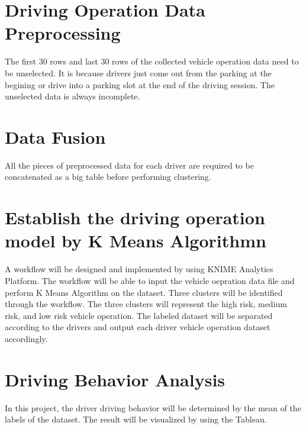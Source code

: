 \section{Driving Operation Data Preprocessing}
The first 30 rows and last 30 rows of the collected vehicle operation data need to be unselected. It is because drivers just come out from the parking at the begining or drive into a parking slot at the end of the driving session. The unselected data is always incomplete.

\section{Data Fusion}
All the pieces of preprocessed data for each driver are required to be concatenated as a big table before performing clustering.

\section{Establish the driving operation model by K Means Algorithmn}
A workflow will be designed and implemented by using KNIME Analytics Platform. The workflow will be able to input the vehicle oepration data file and perform K Means Algorithm on the dataset. Three clusters will be identified through the workflow. The three clusters will represent the high risk, medium risk, and low risk vehicle operation. The labeled dataset will be separated according to the drivers and output each driver vehicle operation dataset accordingly.

\section{Driving Behavior Analysis}
In this project, the driver driving behavior will be determined by the mean of the labels of the dataset. The result will be visualized by using the Tableau.